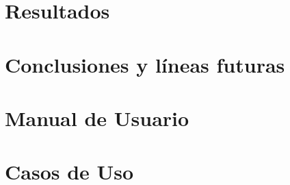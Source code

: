 \documentclass[a4paper, 12pt]{memoir} %
\begin{document}
\chapter{Resultados} \label{chapter:results}


\chapter{Conclusiones y líneas futuras} \label{chapter:concl}


\begin{appendices}
\chapter{Manual de Usuario} \label{chapter:man}


\chapter{Casos de Uso} \label{chapter:use-case}


\end{appendices}

\glsaddall %

\end{document}
